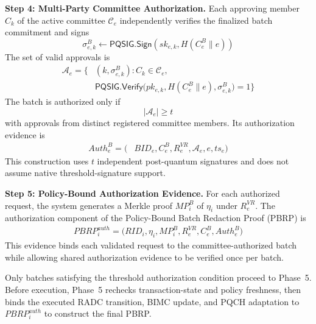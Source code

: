 \documentclass[lettersize,journal]{IEEEtran}
\begin{document}
    \medskip
    \noindent\textbf{Step 4: Multi-Party Committee
    Authorization.}
    Each approving member $C_k$ of the active
    committee $\mathcal{C}_e$ independently verifies
    the finalized batch commitment and signs
    \begin{equation}
    \sigma_{e,k}^{B}
    \leftarrow
    \mathsf{PQSIG.Sign}
    \left(
    sk_{e,k},
    H(C_e^{B}\parallel e)
    \right)
    \end{equation}
    The set of valid approvals is
    \begin{equation}
    \begin{aligned}
    \mathcal{A}_e=\big\{&
    (k,\sigma_{e,k}^{B}): C_k\in\mathcal{C}_e,\\
    &\mathsf{PQSIG.Verify}\big(
    pk_{e,k},
    H(C_e^{B}\parallel e),
    \sigma_{e,k}^{B}\big)=1
    \big\}
    \end{aligned}
    \end{equation}
    The batch is authorized only if
    \begin{equation}
    |\mathcal{A}_e|\geq t
    \end{equation}
    with approvals from distinct registered
    committee members. Its authorization
    evidence is
    \begin{equation}
    \begin{aligned}
    Auth_e^{B}=\big(
    &BID_e,C_e^{B},R_e^{VR},\mathcal{A}_e,e,ts_e\big)
    \end{aligned}
    \end{equation}
    This construction uses $t$ independent
    post-quantum signatures and does not
    assume native threshold-signature support.
    
    \medskip
    \noindent\textbf{Step 5: Policy-Bound
    Authorization Evidence.}
    For each authorized request, the system
    generates a Merkle proof $MP_i^{B}$ of
    $\eta_i$ under $R_e^{VR}$. The authorization
    component of the Policy-Bound Batch
    Redaction Proof (PBRP) is
    \begin{equation}
    \begin{aligned}
    PBRP_i^{auth}=\big(
    RID_i,\eta_i,MP_i^{B},R_e^{VR},C_e^{B},Auth_e^{B}\big)
    \end{aligned}
    \end{equation}
    This evidence binds each validated request
    to the committee-authorized batch while
    allowing shared authorization evidence
    to be verified once per batch.
    
    Only batches satisfying the threshold
    authorization condition proceed to Phase~5.
    Before execution, Phase~5 rechecks
    transaction-state and policy freshness,
    then binds the executed RADC transition,
    BIMC update, and PQCH adaptation to
    $PBRP_i^{auth}$ to construct the final PBRP.
    
\end{document}
